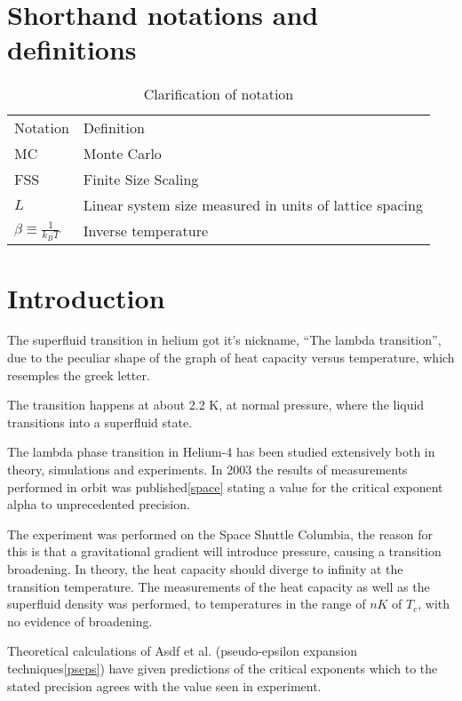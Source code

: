 \documentclass[a4paper]{article}
\begin{document}
\section{Shorthand notations and definitions}
\begin{table}[htpb]
  \begin{center}
    \begin{tabular}{l l}
      Notation & Definition\\
      MC & Monte Carlo\\
      FSS & Finite Size Scaling\\
      $L$ & Linear system size measured in units of lattice spacing\\
      $\beta \equiv \frac{1}{k_B T}$ & Inverse temperature\\
    \end{tabular}
  \end{center}
  \caption{Clarification of notation}
\end{table}
\section{Introduction}
The superfluid transition in helium got it's nickname, ``The lambda transition'', due to the peculiar shape of the graph of heat capacity versus temperature, which resemples the greek letter. 

The transition happens at about 2.2 K, at normal pressure, where the liquid transitions into a superfluid state.


The lambda phase transition in Helium-4 has been studied extensively both in theory, simulations and experiments. In 2003 the results of measurements performed in orbit was published\ref{space} stating a value for the critical exponent alpha to unprecedented precision.

The experiment was performed on the Space Shuttle Columbia, the reason for this is that a gravitational gradient will introduce pressure, causing a transition broadening. In theory, the heat capacity should diverge to infinity at the transition temperature.
The measurements of the heat capacity as well as the superfluid density was performed, to temperatures in the range of $nK$ of $T_c$, with no evidence of broadening.

Theoretical calculations of Asdf et al. (pseudo-epsilon expansion techniques\ref{pseps}) have given predictions of the critical exponents which to the stated precision agrees with the value seen in experiment.
\end{document}
